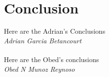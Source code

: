 \section{Conclusion}

Here are the Adrian's Conclusions \\
\textit{Adrian Garcia Betancourt} \\\\
Here are the Obed's conclusions \\
\textit{Obed N Munoz Reynoso}
